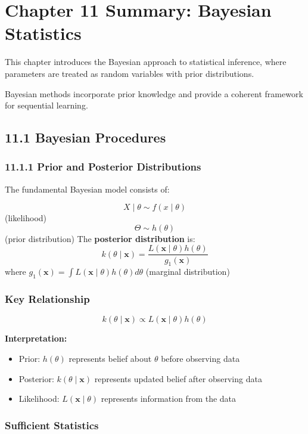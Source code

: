 \section{Chapter 11 Summary: Bayesian Statistics}

This chapter introduces the Bayesian approach to statistical inference, where parameters are treated as random variables with prior distributions.

Bayesian methods incorporate prior knowledge and provide a coherent framework for sequential learning.

\subsection{11.1 Bayesian Procedures}

\subsubsection{11.1.1 Prior and Posterior Distributions}

The fundamental Bayesian model consists of:

\begin{definition}
\[
X \mid \theta \sim f(x \mid \theta)
\] (likelihood)
\[
\Theta \sim h(\theta)
\] (prior distribution)
The \textbf{posterior distribution} is:
\[
k(\theta \mid \mathbf{x}) = \frac{L(\mathbf{x} \mid \theta) h(\theta)}{g_1(\mathbf{x})}
\]
where $g_1(\mathbf{x}) = \int L(\mathbf{x} \mid \theta) h(\theta) d\theta$ (marginal distribution)
\end{definition}
\subsubsection{Key Relationship}
\[
k(\theta \mid \mathbf{x}) \propto L(\mathbf{x} \mid \theta) h(\theta)
\]

\textbf{Interpretation:}

\begin{itemize}
	\item Prior: $h(\theta)$ represents belief about $\theta$ before observing data
	\item Posterior: $k(\theta \mid \mathbf{x})$ represents updated belief after observing data
	\item Likelihood: $L(\mathbf{x} \mid \theta)$ represents information from the data
\end{itemize}

\subsubsection{Sufficient Statistics}

